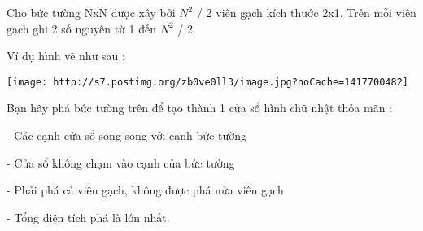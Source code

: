 Cho bức tường NxN được xây bởi $N^{2}$ / 2 viên gạch kích thước 2x1. Trên mỗi viên gạch ghi 2 số nguyên từ 1 đến $N^{2}$ / 2.

Ví dụ hình vẽ như sau :


\texttt{[image: http://s7.postimg.org/zb0ve0ll3/image.jpg?noCache=1417700482]}

Bạn hãy phá bức tường trên để tạo thành 1 cửa sổ hình chữ nhật thỏa mãn :

- Các cạnh cửa sổ song song với cạnh bức tường

- Cửa sổ không chạm vào cạnh của bức tường

- Phải phá cả viên gạch, không được phá nửa viên gạch

- Tổng diện tích phá là lớn nhất.